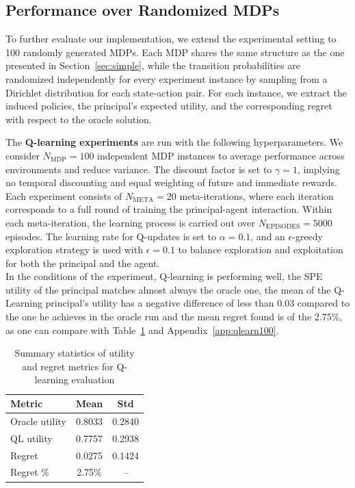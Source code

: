 \documentclass{article}
\theoremstyle{plain}
\theoremstyle{definition}
\theoremstyle{remark}
\begin{document}
\subsection{Performance over Randomized MDPs}
\label{subsec:replication}
To further evaluate our implementation, we extend the experimental setting to 100 randomly generated MDPs. Each MDP shares the same structure as the one presented in Section~\ref{sec:simple}, while the transition probabilities are randomized independently for every experiment instance by sampling from a Dirichlet distribution for each state-action pair. For each instance, we extract the induced policies, the principal's expected utility, and the corresponding regret with respect to the oracle solution.



The \textbf{Q-learning experiments }are run with the following hyperparameters. We consider $N_{\mathrm{MDP}} = 100$ independent MDP instances to average performance across environments and reduce variance. The discount factor is set to $\gamma = 1$, implying no temporal discounting and equal weighting of future and immediate rewards. Each experiment consists of $N_{\mathrm{META}} = 20$ meta-iterations, where each iteration corresponds to a full round of training the principal-agent interaction. Within each meta-iteration, the learning process is carried out over $N_{\mathrm{EPISODES}} = 5000$ episodes. The learning rate for Q-updates is set to $\alpha = 0.1$, and an $\epsilon$-greedy exploration strategy is used with $\epsilon = 0.1$ to balance exploration and exploitation for both the principal and the agent.\\
In the conditions of the experiment, Q-learning is performing well, the SPE utility of the principal matches almost always the oracle one, the mean of the Q-Learning principal's utility has a negative difference of less than 0.03 compared to the one he achieves in the oracle run and the mean regret found is of the $2.75\%$, as one can compare with Table~\ref{tab:utility_regret} and Appendix~\ref{app:qlearn100}.
\begin{table}[H]
\centering
\begin{tabular}{lcc}
\hline
\textbf{Metric} & \textbf{Mean} & \textbf{Std} \\
\hline
Oracle utility & 0.8033 & 0.2840 \\
QL utility    & 0.7757 & 0.2938 \\
Regret        & 0.0275 & 0.1424 \\
Regret \%     & 2.75\% & -- \\
\hline
\end{tabular}
\caption{Summary statistics of utility and regret metrics for Q-learning evaluation}
\label{tab:utility_regret}
\end{table}
\end{document}
